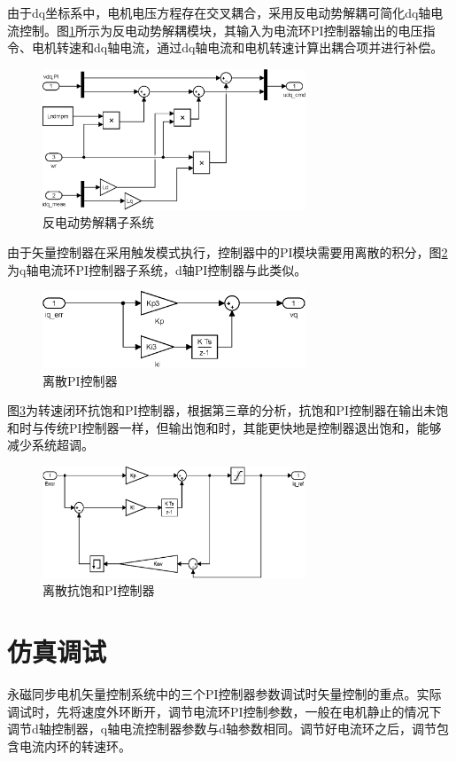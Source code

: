 由于dq坐标系中，电机电压方程存在交叉耦合，采用反电动势解耦可简化dq轴电流控制。图\ref{fig:EMF_decouple}所示为反电动势解耦模块，其输入为电流环PI控制器输出的电压指令、电机转速和dq轴电流，通过dq轴电流和电机转速计算出耦合项并进行补偿。
\begin{figure}[H]
	\centering
	\includegraphics[width=0.7\textwidth]{figs/EMF_decouple.eps}
	\caption{反电动势解耦子系统}
	\label{fig:EMF_decouple}
\end{figure}
由于矢量控制器在采用触发模式执行，控制器中的PI模块需要用离散的积分，图\ref{fig:qpi}为q轴电流环PI控制器子系统，d轴PI控制器与此类似。
\begin{figure}[H]
	\centering
	\includegraphics[width=0.7\textwidth]{figs/qpi.eps}
	\caption{离散PI控制器}
	\label{fig:qpi}
\end{figure}
图\ref{fig:anti_windup_pi}为转速闭环抗饱和PI控制器，根据第三章的分析，抗饱和PI控制器在输出未饱和时与传统PI控制器一样，但输出饱和时，其能更快地是控制器退出饱和，能够减少系统超调。
\begin{figure}[H]
	\centering
	\includegraphics[width=0.7\textwidth]{figs/anti_windup_pi_speed.eps}
	\caption{离散抗饱和PI控制器}
	\label{fig:anti_windup_pi}
\end{figure}
\section{仿真调试}
永磁同步电机矢量控制系统中的三个PI控制器参数调试时矢量控制的重点。实际调试时，先将速度外环断开，调节电流环PI控制参数，一般在电机静止的情况下调节d轴控制器，q轴电流控制器参数与d轴参数相同。调节好电流环之后，调节包含电流内环的转速环。


